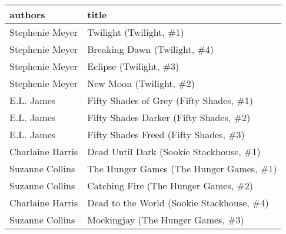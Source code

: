 \begin{tabular}{ll}
\toprule
          authors &                                      title \\
\midrule
  Stephenie Meyer &                    Twilight (Twilight, \#1) \\
  Stephenie Meyer &               Breaking Dawn (Twilight, \#4) \\
  Stephenie Meyer &                     Eclipse (Twilight, \#3) \\
  Stephenie Meyer &                    New Moon (Twilight, \#2) \\
       E.L. James &    Fifty Shades of Grey (Fifty Shades, \#1) \\
       E.L. James &     Fifty Shades Darker (Fifty Shades, \#2) \\
       E.L. James &      Fifty Shades Freed (Fifty Shades, \#3) \\
 Charlaine Harris &    Dead Until Dark (Sookie Stackhouse, \#1) \\
  Suzanne Collins &    The Hunger Games (The Hunger Games, \#1) \\
  Suzanne Collins &       Catching Fire (The Hunger Games, \#2) \\
 Charlaine Harris &  Dead to the World (Sookie Stackhouse, \#4) \\
  Suzanne Collins &          Mockingjay (The Hunger Games, \#3) \\
\bottomrule
\end{tabular}
